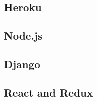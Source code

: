 \subsection{Heroku}


\subsection{Node.js}


\subsection{Django}


\subsection{React and Redux}


% 